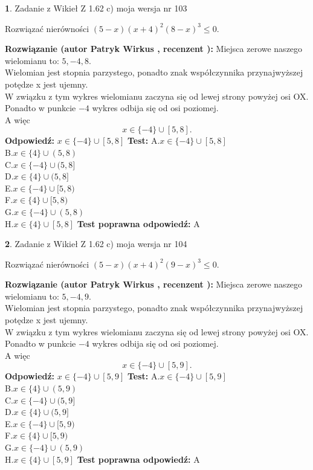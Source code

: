 \documentclass[12pt, a4paper]{article}
\theoremstyle{definition} %
\newtheorem{zad}{}
\newcommand{\zadStart}[1]{\begin{zad}#1\newline}
\newcommand{\zadStop}{\end{zad}}
\newcommand{\rozwStart}[2]{\noindent \textbf{Rozwiązanie (autor #1 , recenzent #2): }\newline}
\newcommand{\rozwStop}{\newline}
\newcommand{\odpStart}{\noindent \textbf{Odpowiedź:}\newline}
\newcommand{\odpStop}{\newline}
\newcommand{\testStart}{\noindent \textbf{Test:}\newline}
\newcommand{\testStop}{\newline}
\newcommand{\kluczStart}{\noindent \textbf{Test poprawna odpowiedź:}\newline}
\newcommand{\kluczStop}{\newline}
\begin{document}
\zadStart{Zadanie z Wikieł Z 1.62 c) moja wersja nr 103}

Rozwiązać nierówności $(5-x)(x+4)^{2}(8-x)^{3}\le0$.
\zadStop
\rozwStart{Patryk Wirkus}{}
Miejsca zerowe naszego wielomianu to: $5, -4, 8$.\\
Wielomian jest stopnia parzystego, ponadto znak współczynnika przy\linebreak najwyższej potędze x jest ujemny.\\ W związku z tym wykres wielomianu zaczyna się od lewej strony powyżej osi OX.\\
Ponadto w punkcie $-4$ wykres odbija się od osi poziomej.\\
A więc $$x \in \{-4\} \cup [5,8].$$
\rozwStop
\odpStart
$x \in \{-4\} \cup [5,8]$
\odpStop
\testStart
A.$x \in \{-4\} \cup [5,8]$\\
B.$x \in \{4\} \cup (5,8)$\\
C.$x \in \{-4\} \cup (5,8]$\\
D.$x \in \{4\} \cup (5,8]$\\
E.$x \in \{-4\} \cup [5,8)$\\
F.$x \in \{4\} \cup [5,8)$\\
G.$x \in \{-4\} \cup (5,8)$\\
H.$x \in \{4\} \cup [5,8]$
\testStop
\kluczStart
A
\kluczStop



\zadStart{Zadanie z Wikieł Z 1.62 c) moja wersja nr 104}

Rozwiązać nierówności $(5-x)(x+4)^{2}(9-x)^{3}\le0$.
\zadStop
\rozwStart{Patryk Wirkus}{}
Miejsca zerowe naszego wielomianu to: $5, -4, 9$.\\
Wielomian jest stopnia parzystego, ponadto znak współczynnika przy\linebreak najwyższej potędze x jest ujemny.\\ W związku z tym wykres wielomianu zaczyna się od lewej strony powyżej osi OX.\\
Ponadto w punkcie $-4$ wykres odbija się od osi poziomej.\\
A więc $$x \in \{-4\} \cup [5,9].$$
\rozwStop
\odpStart
$x \in \{-4\} \cup [5,9]$
\odpStop
\testStart
A.$x \in \{-4\} \cup [5,9]$\\
B.$x \in \{4\} \cup (5,9)$\\
C.$x \in \{-4\} \cup (5,9]$\\
D.$x \in \{4\} \cup (5,9]$\\
E.$x \in \{-4\} \cup [5,9)$\\
F.$x \in \{4\} \cup [5,9)$\\
G.$x \in \{-4\} \cup (5,9)$\\
H.$x \in \{4\} \cup [5,9]$
\testStop
\kluczStart
A
\kluczStop
\end{document}
